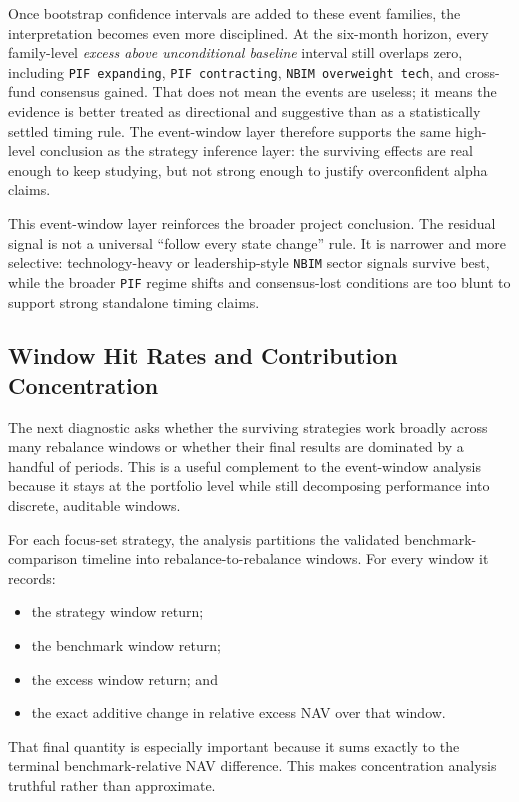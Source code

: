 \documentclass[conference]{IEEEtran}
\begin{document}
Once bootstrap confidence intervals are added to these event families, the interpretation becomes even more disciplined. At the six-month horizon, every family-level \emph{excess above unconditional baseline} interval still overlaps zero, including \texttt{PIF expanding}, \texttt{PIF contracting}, \texttt{NBIM overweight tech}, and cross-fund consensus gained. That does not mean the events are useless; it means the evidence is better treated as directional and suggestive than as a statistically settled timing rule. The event-window layer therefore supports the same high-level conclusion as the strategy inference layer: the surviving effects are real enough to keep studying, but not strong enough to justify overconfident alpha claims.

This event-window layer reinforces the broader project conclusion. The residual signal is not a universal ``follow every state change'' rule. It is narrower and more selective: technology-heavy or leadership-style \texttt{NBIM} sector signals survive best, while the broader \texttt{PIF} regime shifts and consensus-lost conditions are too blunt to support strong standalone timing claims.

\subsection{Window Hit Rates and Contribution Concentration}

The next diagnostic asks whether the surviving strategies work broadly across many rebalance windows or whether their final results are dominated by a handful of periods. This is a useful complement to the event-window analysis because it stays at the portfolio level while still decomposing performance into discrete, auditable windows.

For each focus-set strategy, the analysis partitions the validated benchmark-comparison timeline into rebalance-to-rebalance windows. For every window it records:
\begin{itemize}[leftmargin=1.4em]
    \item the strategy window return;
    \item the benchmark window return;
    \item the excess window return; and
    \item the exact additive change in relative excess NAV over that window.
\end{itemize}

That final quantity is especially important because it sums exactly to the terminal benchmark-relative NAV difference. This makes concentration analysis truthful rather than approximate.
\end{document}
